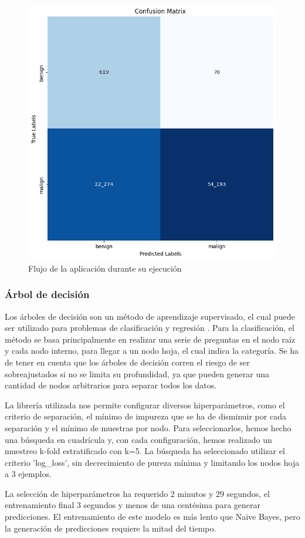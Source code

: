 \begin{figure}[H]
    \begin{center}
        \includegraphics[width=0.52\linewidth]{media/packet_pincer_train_models_Naive bayes.png}
    \end{center}
    \caption{Flujo de la aplicación durante su ejecución}\label{fig:naivebayesmatrix}
  \end{figure}

\subsubsection{Árbol de decisión}

Los árboles de decisión son un método de aprendizaje supervisado, el cual puede ser utilizado para problemas de clasificación y regresión \cite{ibmdecisiontrees}. Para la clasificación, el método se basa principalmente en realizar una serie de preguntas en el nodo raíz y cada nodo interno, para llegar a un nodo hoja, el cual indica la categoría. Se ha de tener en cuenta que los árboles de decisión corren el riesgo de ser sobreajustados si no se limita su profundidad, ya que pueden generar una cantidad de nodos arbitrarios para separar todos los datos.

La librería utilizada nos permite configurar diversos hiperparámetros, como el criterio de separación, el mínimo de impureza que se ha de disminuir por cada separación y el mínimo de muestras por nodo. Para seleccionarlos, hemos hecho una búsqueda en cuadrícula y, con cada configuración, hemos realizado un muestreo k-fold estratificado con k=5. La búsqueda ha seleccionado utilizar el criterio 'log\_loss', sin decrecimiento de pureza mínima y limitando los nodos hoja a 3 ejemplos.

La selección de hiperparámetros ha requerido 2 minutos y 29 segundos, el entrenamiento final 3 segundos y menos de una centésima para generar predicciones. El entrenamiento de este modelo es más lento que Naive Bayes, pero la generación de predicciones requiere la mitad del tiempo.

